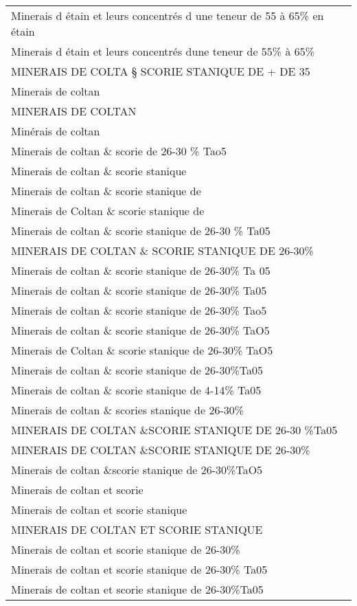 \documentclass[
]{book}
\begin{document}
\begin{longtable}[t]{l}
Minerais d étain et leurs concentrés d une teneur de 55 à 65\% en étain\\
Minerais d étain et leurs concentrés dune teneur de 55\% à 65\%\\
MINERAIS DE COLTA § SCORIE STANIQUE DE + DE 35\\
Minerais de coltan\\
\addlinespace
MINERAIS DE COLTAN\\
Minérais de coltan\\
Minerais de coltan \& scorie de 26-30 \% Tao5\\
Minerais de coltan \& scorie stanique\\
Minerais de coltan \& scorie stanique de\\
\addlinespace
Minerais de Coltan \& scorie stanique de\\
Minerais de coltan \& scorie stanique de 26-30 \% Ta05\\
MINERAIS DE COLTAN \& SCORIE STANIQUE DE 26-30\%\\
Minerais de coltan \& scorie stanique de 26-30\% Ta 05\\
Minerais de coltan \& scorie stanique de 26-30\% Ta05\\
\addlinespace
Minerais de coltan \& scorie stanique de 26-30\% Tao5\\
Minerais de coltan \& scorie stanique de 26-30\% TaO5\\
Minerais de Coltan \& scorie stanique de 26-30\% TaO5\\
Minerais de coltan \& scorie stanique de 26-30\%Ta05\\
Minerais de coltan \& scorie stanique de 4-14\% Ta05\\
\addlinespace
Minerais de coltan \& scories stanique de 26-30\%\\
MINERAIS DE COLTAN \&SCORIE STANIQUE DE 26-30 \%Ta05\\
MINERAIS DE COLTAN \&SCORIE STANIQUE DE 26-30\%\\
Minerais de coltan \&scorie stanique de 26-30\%TaO5\\
Minerais de coltan et scorie\\
\addlinespace
Minerais de coltan et scorie stanique\\
MINERAIS DE COLTAN ET SCORIE STANIQUE\\
Minerais de coltan et scorie stanique de 26-30\%\\
Minerais de coltan et scorie stanique de 26-30\% Ta05\\
Minerais de coltan et scorie stanique de 26-30\%Ta05\\

\end{longtable}
\end{document}
